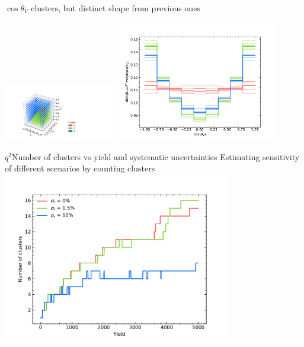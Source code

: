 \begin{frame}{$\cos\theta_V$}
	 clusters, but distinct shape from previous ones
	\begin{changemargin}{-1cm}{-1cm}
		{\includegraphics[width=5cm,clip,trim=3cm 0.3cm 7.5cm 1cm]{figures/from-paper/cosV_3D.pdf}}
		{\includegraphics[width=7cm,clip,trim=0.3cm 0.cm 1.5cm 0cm]{figures/from-paper/cosV_dist.pdf}}
	\end{changemargin}
\end{frame}
%
\begin{frame}{$q^2$}{Number of clusters vs yield and systematic uncertainties}
	\centering
	Estimating sensitivity of different scenarios by counting clusters
	\includegraphics[width=10cm,clip,trim=0cm 0cm 0cm 1cm]{figures/from-paper/clust_yield.pdf}
\end{frame}
%
